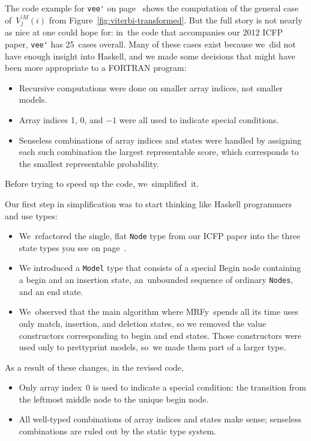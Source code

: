 \documentclass[]{jfp1}
\newcommand\mrfy{MRFy} %
\newcommand\figref[1]{Figure~\ref{fig:#1}}
\begin{document}
The code example for \verb+vee'+ on page~\pageref{code:vee-prime}
shows the computation of the general case of~$V^{\prime M}_j(i)$ from 
\figref{viterbi-transformed}.
But the full story is not nearly as nice at one could hope for:
in~the code that accompanies our 2012 ICFP paper,
\verb+vee'+ has 25~cases overall.
Many of these cases exist because we~did not have enough insight into
Haskell, and we made some decisions that might have been more
appropriate to a FORTRAN program:
\begin{itemize}
\item
Recursive computations were done on smaller array indices, not smaller
models.
\item
Array indices 1, 0, and $-1$ were all used to indicate special
conditions.
\item
Senseless combinations of array indices and states were handled by
assigning each such combination the largest representable score, which
corresponds to the smallest representable probability.
\end{itemize}
Before trying to speed up the code, we~simplified~it.


Our first step in simplification was to start thinking like Haskell
programmers and use types:
\begin{itemize}
\item
We~refactored the single, flat \texttt{Node} type from our ICFP paper
into the three state types you see on page~\pageref{code:model3-node}.
\item 
We introduced a \texttt{Model} type that consists of a special Begin
node containing a begin and an insertion state, an~unbounded sequence
of ordinary \texttt{Nodes}, and an end state.
\item
We~observed that the main algorithm where \mrfy\ spends all its time
uses only match, insertion, and deletion states, so we removed the
value constructors corresponding to begin and end states.
Those constructors were used only to prettyprint models, so~we made
them part of a larger type.
\end{itemize}
As a result of these changes, in the revised code,
\begin{itemize}
\item
Only array index~0 is used to indicate a special
condition: the transition from the leftmost middle node to the unique
begin node.
\item
All well-typed combinations of array indices and states make sense;
senseless combinations are ruled out by the static type system.
\end{itemize}
\end{document}
